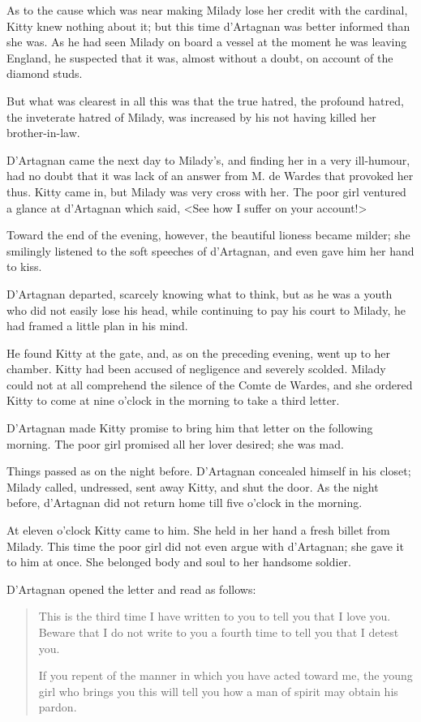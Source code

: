 As to the cause which was near making Milady lose her credit with the cardinal, Kitty knew nothing about it; but this time d'Artagnan was better informed than she was. As he had seen Milady on board a vessel at the moment he was leaving England, he suspected that it was, almost without a doubt, on account of the diamond studs. 

But what was clearest in all this was that the true hatred, the profound hatred, the inveterate hatred of Milady, was increased by his not having killed her brother-in-law. 

D'Artagnan came the next day to Milady's, and finding her in a very ill-humour, had no doubt that it was lack of an answer from M. de Wardes that provoked her thus. Kitty came in, but Milady was very cross with her. The poor girl ventured a glance at d'Artagnan which said, <See how I suffer on your account!> 

Toward the end of the evening, however, the beautiful lioness became milder; she smilingly listened to the soft speeches of d'Artagnan, and even gave him her hand to kiss. 

D'Artagnan departed, scarcely knowing what to think, but as he was a youth who did not easily lose his head, while continuing to pay his court to Milady, he had framed a little plan in his mind. 

He found Kitty at the gate, and, as on the preceding evening, went up to her chamber. Kitty had been accused of negligence and severely scolded. Milady could not at all comprehend the silence of the Comte de Wardes, and she ordered Kitty to come at nine o'clock in the morning to take a third letter. 

D'Artagnan made Kitty promise to bring him that letter on the following morning. The poor girl promised all her lover desired; she was mad. 

Things passed as on the night before. D'Artagnan concealed himself in his closet; Milady called, undressed, sent away Kitty, and shut the door. As the night before, d'Artagnan did not return home till five o'clock in the morning. 

At eleven o'clock Kitty came to him. She held in her hand a fresh billet from Milady. This time the poor girl did not even argue with d'Artagnan; she gave it to him at once. She belonged body and soul to her handsome soldier. 

D'Artagnan opened the letter and read as follows: 

\begin{quotation}
This is the third time I have written to you to tell you that I love you. Beware that I do not write to you a fourth time to tell you that I detest you.

If you repent of the manner in which you have acted toward me, the young girl who brings you this will tell you how a man of spirit may obtain his pardon. 
\end{quotation}

